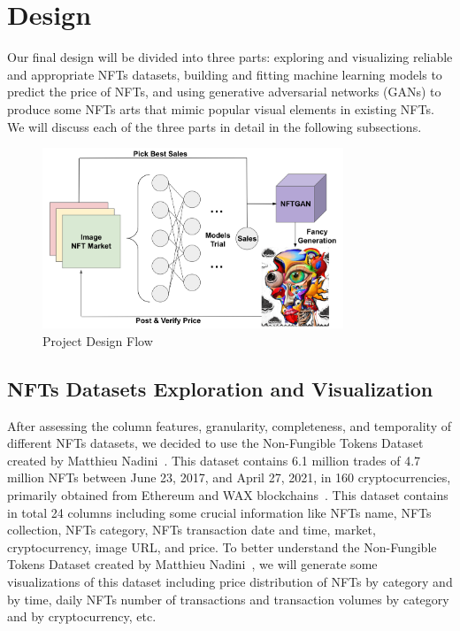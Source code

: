 

\section{Design}
Our final design will be divided into three parts: exploring and visualizing reliable and appropriate NFTs datasets, building and fitting machine learning models to predict the price of NFTs, and using generative adversarial networks (GANs) to produce some NFTs arts that mimic popular visual elements in existing NFTs. We will discuss each of the three parts in detail in the following subsections. 

\begin{figure}[htbp] \centering 
\includegraphics[width=9cm]{Figure/Project Design Flow.jpg} 
\caption{Project Design Flow} 
\label{fig:graph} 
\end{figure} 

\subsection{NFTs Datasets Exploration and Visualization}
After assessing the column features, granularity, completeness, and temporality of different NFTs datasets, we decided to use the Non-Fungible Tokens Dataset created by Matthieu Nadini~\cite{nadini2021mapping}. This dataset contains 6.1 million trades of 4.7 million NFTs between June 23, 2017, and April 27, 2021, in 160 cryptocurrencies, primarily obtained from Ethereum and WAX blockchains~\cite{nadini2021mapping}. This dataset contains in total 24 columns including some crucial information like NFTs name, NFTs collection, NFTs category, NFTs transaction date and time, market, cryptocurrency, image URL, and price. To better understand the Non-Fungible Tokens Dataset created by Matthieu Nadini~\cite{nadini2021mapping}, we will generate some visualizations of this dataset including price distribution of NFTs by category and by time, daily NFTs number of transactions and transaction volumes by category and by cryptocurrency, etc.

